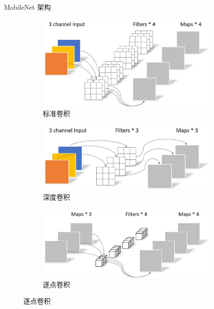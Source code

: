 \documentclass{beamer}
\begin{document}
\begin{frame}{MobileNet 架构}
    \begin{figure}
        \centering
        \begin{subfigure}[b]{0.32\textwidth}
            \centering
            \includegraphics[width=\linewidth]{pic/std_cov.jpg}
            \caption{标准卷积}
        \end{subfigure}
        \begin{subfigure}[b]{0.32\textwidth}
            \centering
            \includegraphics[width=\linewidth]{pic/dpth_cov.jpg}
            \caption{深度卷积}
        \end{subfigure}
        \begin{subfigure}[b]{0.32\textwidth}
            \centering
            \includegraphics[width=\linewidth]{pic/sep_cov.jpg}
            \caption{逐点卷积}
        \end{subfigure}
    \end{figure}
\end{frame}
\end{document}
